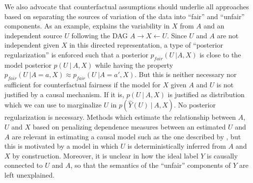 We also advocate that counterfactual assumptions should underlie all approaches based on separating the sources of variation of the data into ``fair'' and ``unfair'' components. As an example, \citet{louizos2015variational} explains the variability in $X$ from $A$ and an independent source $U$ following the DAG $A \rightarrow X \leftarrow U$. Since $U$ and $A$ are not independent given $X$ in this directed representation, a type of ``posterior regularization'' \citep{ganchev:10} is enforced such that a posterior $p_{fair}(U\ | A, X)$ is close to the model posterior $p(U\ |\ A, X)$ while having the property $p_{fair}(U\ | A = a, X) \approx p_{fair}(U\ | A = a', X)$. But this is neither necessary nor sufficient for counterfactual fairness if the model for $X$ given $A$ and $U$ is not justified by a causal mechanism. If it is, $p(U\ |\ A, X)$ is justified as distribution which we can use to marginalize $U$ in $p(\hat Y(U)\ |\ A, X)$. No posterior regularization is necessary.  Methods which estimate the relationship between $A$, $U$ and $X$ based on penalizing dependence measures between an estimated $U$ and $A$ are relevant in estimating a causal model such as the one described by \citet{mooij:09}, but this is motivated by a model in which $U$ is deterministically inferred from $A$ and $X$ by construction. Moreover, it is unclear in \citet{louizos2015variational} how the ideal label $Y$ is causally connected to $U$ and $A$, so that the semantics of the ``unfair''
components of $Y$ are left unexplained.


